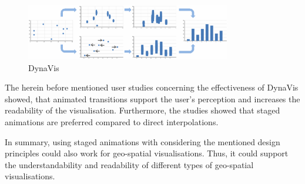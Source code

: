 \begin{figure}[!htb]
\centering
\includegraphics[width=0.8\textwidth, keepaspectratio]{images/methods/related/dynavis.png}
\caption[
    DynaVis .
]{DynaVis}
\label{fig:dynavis}
\end{figure}

The herein before mentioned user studies concerning the effectiveness of DynaVis showed, that animated transitions support the user's perception and increases the readability of the visualisation. Furthermore, the studies showed that staged animations are preferred compared to direct interpolations.

In summary, using staged animations with considering the mentioned design principles could also work for geo-spatial visualisations. Thus, it could support the understandability and readability of different types of geo-spatial visualisations.
